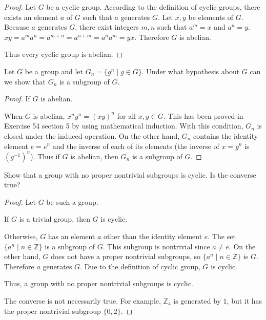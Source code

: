 \begin{proof}
    Let $G$ be a cyclic group. According to the definition of cyclic groups, there exists an element $a$ of $G$ such that $a$ generates $G$. Let $x, y$ be elements of $G$. Because $a$ generates $G$, there exist integers $m, n$ such that $a^{m} = x$ and $a^{n} = y$. $xy = a^{m}a^{n} = a^{m+n} = a^{n+m} = a^{n}a^{m} = yx$. Therefore $G$ is abelian.

    Thus every cyclic group is abelian.
\end{proof}

\begin{exercise}
    Let $G$ be a group and let $G_{n} = \{ g^{n} \mid g\in G \}$. Under what hypothesis about $G$ can we show that $G_{n}$ is a subgroup of $G$.
\end{exercise}

\begin{proof}
    If $G$ is abelian.

    When $G$ is abelian, $x^{n}y^{n} = {(xy)}^{n}$ for all $x, y\in G$. This has been proved in Exercise 54 section 5 by using mathematical induction. With this condition, $G_{n}$ is closed under the induced operation. On the other hand, $G_{n}$ contains the identity element $e = e^{n}$ and the inverse of each of its elements (the inverse of $x = g^{n}$ is ${(g^{-1})}^{n}$). Thus if $G$ is abelian, then $G_{n}$ is a subgroup of $G$.
\end{proof}

\begin{exercise}
    Show that a group with no proper nontrivial subgroups is cyclic. Is the converse true?
\end{exercise}

\begin{proof}
    Let $G$ be such a group.

    If $G$ is a trivial group, then $G$ is cyclic.

    Otherwise, $G$ has an element $a$ other than the identity element $e$. The set $\{ a^{n} \mid n\in\mathbb{Z} \}$ is a subgroup of $G$. This subgroup is nontrivial since $a\ne e$. On the other hand, $G$ does not have a proper nontrivial subgroups, so $\{ a^{n} \mid n\in\mathbb{Z} \}$ is $G$. Therefore $a$ generates $G$. Due to the definition of cyclic group, $G$ is cyclic.

    Thus, a group with no proper nontrivial subgroups is cyclic.

    The converse is not necessarily true. For example, $\mathbb{Z}_{4}$ is generated by $1$, but it has the proper nontrivial subgroup $\{ 0, 2 \}$.
\end{proof}

